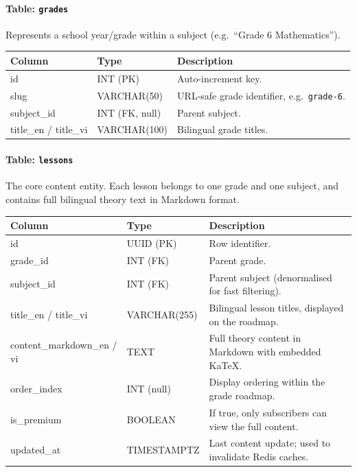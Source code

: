 \paragraph{Table: \texttt{grades}}
Represents a school year/grade within a subject (e.g.\ ``Grade 6 Mathematics'').

\begin{longtable}{|p{4.2cm}|p{3cm}|p{6.8cm}|}
\hline \textbf{Column} & \textbf{Type} & \textbf{Description} \\ \hline
id & INT (PK) & Auto-increment key. \\ \hline
slug & VARCHAR(50) & URL-safe grade identifier, e.g.\ \texttt{grade-6}. \\ \hline
subject\_id & INT (FK, null) & Parent subject. \\ \hline
title\_en / title\_vi & VARCHAR(100) & Bilingual grade titles. \\ \hline
\end{longtable}

\paragraph{Table: \texttt{lessons}}
The core content entity. Each lesson belongs to one grade and one subject, and contains full bilingual theory text in Markdown format.

\begin{longtable}{|p{4.2cm}|p{3cm}|p{6.8cm}|}
\hline \textbf{Column} & \textbf{Type} & \textbf{Description} \\ \hline
id & UUID (PK) & Row identifier. \\ \hline
grade\_id & INT (FK) & Parent grade. \\ \hline
subject\_id & INT (FK) & Parent subject (denormalised for fast filtering). \\ \hline
title\_en / title\_vi & VARCHAR(255) & Bilingual lesson titles, displayed on the roadmap. \\ \hline
content\_markdown\_en / vi & TEXT & Full theory content in Markdown with embedded KaTeX. \\ \hline
order\_index & INT (null) & Display ordering within the grade roadmap. \\ \hline
is\_premium & BOOLEAN & If true, only subscribers can view the full content. \\ \hline
updated\_at & TIMESTAMPTZ & Last content update; used to invalidate Redis caches. \\ \hline
\end{longtable}


